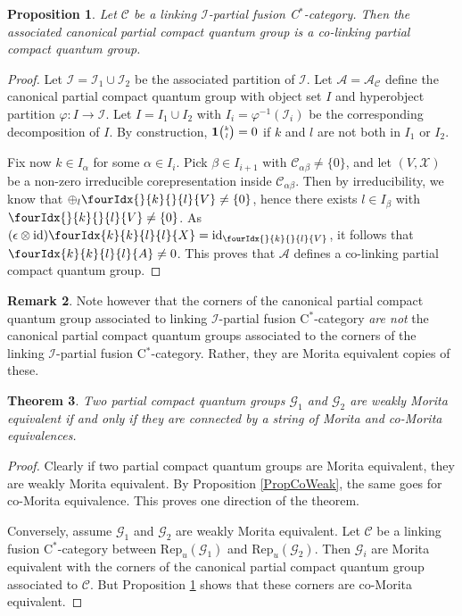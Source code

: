\documentclass[10pt]{article}
\DeclareMathOperator{\id}{id}
\newcommand{\CatC}{\mathcal{C}}
\newcommand{\CatCC}{\mathscr{C}}
\newcommand{\Rep}{\mathrm{Rep}}
\newcommand{\Grt}[3]{#1{\tiny{\begin{pmatrix} #2\\#3\end{pmatrix}}}}
\newcommand{\UnitC}[2]{\Grt{\mathbf{1}}{#1}{#2}}
\newcommand{\Gr}[5]{\fourIdx{#2}{#4}{#3}{#5}{#1}}%
\newcommand{\Gru}[3]{\Gr{#1}{}{}{#2}{#3}}
\newtheorem{Theorem}{Theorem}[section]
\newtheorem{Prop}[Theorem]{Proposition}
\theoremstyle{definition}
\newtheorem{Rem}[Theorem]{Remark}
\numberwithin{equation}{section}
\begin{document}
\begin{Prop}\label{PropCoLink} Let $\CatCC$ be a linking $\mathscr{I}$-partial fusion C$^*$-category. Then the associated canonical partial compact quantum group is a co-linking partial compact quantum group. 
\end{Prop} 

\begin{proof} Let $\mathscr{I}= \mathscr{I}_1\cup \mathscr{I}_2$ be the associated partition of $\mathscr{I}$. Let $\mathscr{A} = \mathscr{A}_{\CatCC}$ define the canonical partial compact quantum group with object set $I$ and hyperobject partition $\varphi:I\rightarrow \mathscr{I}$. Let $I=I_1\cup I_2$ with $I_i = \varphi^{-1}(\mathscr{I}_i)$ be the corresponding decomposition of $I$. By construction, $\UnitC{k}{l}=0$ if $k$ and $l$ are not both in $I_1$ or $I_2$. 

Fix now $k\in I_{\alpha}$ for some $\alpha \in I_i$. Pick $\beta\in I_{i+1}$ with $\CatC_{\alpha\beta}\neq\{0\}$, and let $(V,\mathscr{X})$ be a non-zero irreducible corepresentation inside $\CatC_{\alpha\beta}$. Then by irreducibility, we know that $\oplus_l \Gru{V}{k}{l} \neq \{0\}$, hence there exists $l\in I_{\beta}$ with $\Gru{V}{k}{l}\neq \{0\}$. As $(\epsilon\otimes \id)\Gr{X}{k}{l}{k}{l} = \id_{\Gru{V}{k}{l}}$, it follows that $\Gr{A}{k}{l}{k}{l} \neq 0$. This proves that $\mathscr{A}$ defines a co-linking partial compact quantum group.
\end{proof} 

\begin{Rem} Note however that the corners of the canonical partial compact quantum group associated to linking $\mathscr{I}$-partial fusion C$^*$-category \emph{are not} the canonical partial compact quantum groups associated to the corners of the linking $\mathscr{I}$-partial fusion C$^*$-category. Rather, they are Morita equivalent copies of these.
\end{Rem} 

\begin{Theorem} Two partial compact quantum groups $\mathscr{G}_1$ and $\mathscr{G}_2$ are weakly Morita equivalent if and only if they are connected by a string of Morita and co-Morita equivalences. 
\end{Theorem}

\begin{proof} Clearly if two partial compact quantum groups are Morita equivalent, they are weakly Morita equivalent. By Proposition \ref{PropCoWeak}, the same goes for co-Morita equivalence. This proves one direction of the theorem. 

Conversely, assume $\mathscr{G}_1$ and $\mathscr{G}_2$ are weakly Morita equivalent. Let $\CatCC$ be a linking fusion C$^*$-category between $\Rep_u(\mathscr{G}_1)$ and $\Rep_u(\mathscr{G}_2)$. Then $\mathscr{G}_i$ are Morita equivalent with the corners of the canonical partial compact quantum group associated to $\CatCC$. But Proposition \ref{PropCoLink} shows that these corners are co-Morita equivalent. 
\end{proof} 
\end{document}
